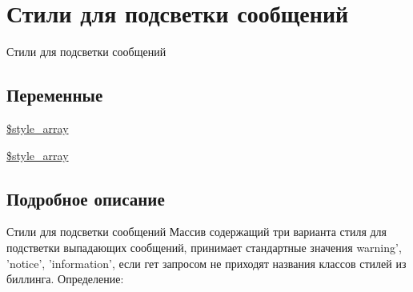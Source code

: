 \hypertarget{group__styles}{\section{Стили для подсветки сообщений}
\label{group__styles}
}


Стили для подсветки сообщений  


\subsection*{Переменные}
\begin{DoxyCompactItemize}
\item 
\hyperlink{group__styles_ga3af2130ca49d5b6d94c67af0775e6a0b}{\$style\-\_\-array}
\item 
\hyperlink{group__styles_ga3af2130ca49d5b6d94c67af0775e6a0b}{\$style\-\_\-array}
\end{DoxyCompactItemize}


\subsection{Подробное описание}
Стили для подсветки сообщений Массив содержащий три варианта стиля для подстветки выпадающих сообщений, принимает стандартные значения warning', 'notice', 'information', если гет запросом не приходят названия классов стилей из биллинга. Определение\-: 
 

